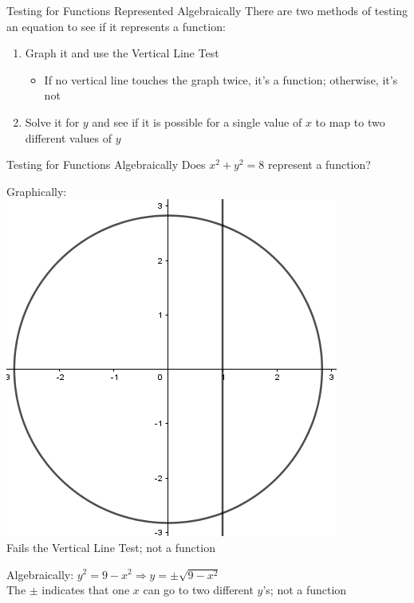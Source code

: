 \documentclass{beamer}
\begin{document}
\begin{frame}[t]{Testing for Functions Represented Algebraically}
There are two methods of testing an equation to see if it represents a function: \begin{enumerate}[1)]
\item Graph it and use the Vertical Line Test
\begin{itemize}
\item If no vertical line touches the graph twice, it's a function; otherwise, it's not
\end{itemize}
\item Solve it for $y$ and see if it is possible for a single value of $x$ to map to two different values of $y$
\end{enumerate}
\end{frame}

\begin{frame}[t]{Testing for Functions Algebraically}
Does $x^2 + y^2 = 8$ represent a function?

\pause Graphically: \\
\includegraphics[scale=0.25]{CircleGraph.png} \\
\pause Fails the Vertical Line Test; not a function

\pause

Algebraically:
$y^2 = 9 - x^2 \Rightarrow y = \pm\sqrt{9 - x^2}$ \\
\pause The $\pm$ indicates that one $x$ can go to two different $y$'s; not a function
\end{frame}
\end{document}
